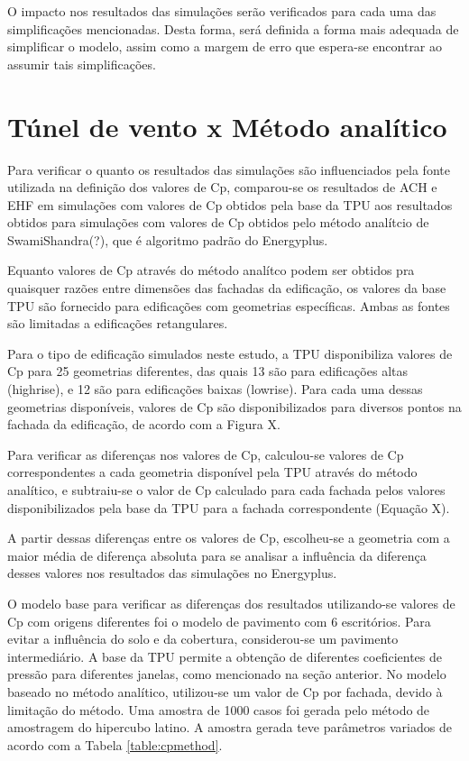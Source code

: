 \documentclass[brazil,hardcopy,openany,a5paper]{ufscthesis}
\begin{document}
		O impacto nos resultados das simulações serão verificados para cada uma das simplificações mencionadas. Desta forma, será definida a forma mais adequada de simplificar o modelo, assim como a margem de erro que espera-se encontrar ao assumir tais simplificações.
		
		\section{Túnel de vento x Método analítico}
		
		Para verificar o quanto os resultados das simulações são influenciados pela fonte utilizada na definição dos valores de Cp, comparou-se os resultados de ACH e EHF em simulações com valores de Cp obtidos pela base da TPU aos resultados obtidos para simulações com valores de Cp obtidos pelo método analítcio de SwamiShandra(?), que é algoritmo padrão do Energyplus.
		
		Equanto valores de Cp através do método analítco podem ser obtidos pra quaisquer razões entre dimensões das fachadas da edificação, os valores da base TPU são fornecido para edificações com geometrias específicas. Ambas as fontes são limitadas a edificações retangulares.
		
		Para o tipo de edificação simulados neste estudo, a TPU disponibiliza valores de Cp para 25 geometrias diferentes, das quais 13 são para edificações altas (highrise), e 12 são para edificações baixas (lowrise). Para cada uma dessas geometrias disponíveis, valores de Cp são disponibilizados para diversos pontos na fachada da edificação, de acordo com a Figura X.
		
		Para verificar as diferenças nos valores de Cp, calculou-se valores de Cp correspondentes a cada geometria disponível pela TPU através do método analítico, e subtraiu-se o valor de Cp calculado para cada fachada pelos valores disponibilizados pela base da TPU para a fachada correspondente (Equação X).
		
		A partir dessas diferenças entre os valores de Cp, escolheu-se a geometria com a maior média de diferença absoluta para se analisar a influência da diferença desses valores nos resultados das simulações no Energyplus.
		
		O modelo base para verificar as diferenças dos resultados utilizando-se valores de Cp com origens diferentes foi o modelo de pavimento com 6 escritórios. Para evitar a influência do solo e da cobertura, considerou-se um pavimento intermediário. A base da TPU permite a obtenção de diferentes coeficientes de pressão para diferentes janelas, como mencionado na seção anterior. No modelo baseado no método analítico, utilizou-se um valor de Cp por fachada, devido à limitação do método. Uma amostra de 1000 casos foi gerada pelo método de amostragem do hipercubo latino. A amostra gerada teve parâmetros variados de acordo com a Tabela \ref{table:cpmethod}.
		
\end{document}
